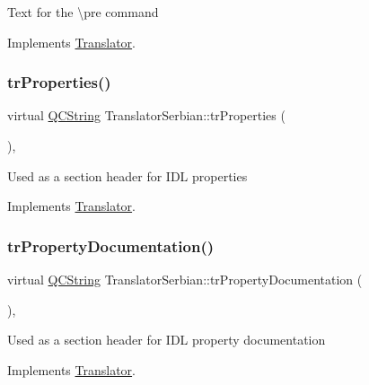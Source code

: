 Text for the \textbackslash{}pre command 

Implements \mbox{\hyperlink{class_translator}{Translator}}.

\mbox{\label{class_translator_serbian_aa25277f2f4e0caf962b810f2e9c65b0d}} 
\subsubsection{\texorpdfstring{trProperties()}{trProperties()}}
{\footnotesize\ttfamily virtual \mbox{\hyperlink{class_q_c_string}{Q\+C\+String}} Translator\+Serbian\+::tr\+Properties (\begin{DoxyParamCaption}{ }\end{DoxyParamCaption})\hspace{0.3cm}{\ttfamily [inline]}, {\ttfamily [virtual]}}

Used as a section header for I\+DL properties 

Implements \mbox{\hyperlink{class_translator}{Translator}}.

\mbox{\label{class_translator_serbian_ae1e53b1d4c7f31d633de6c02971144b8}} 
\subsubsection{\texorpdfstring{trPropertyDocumentation()}{trPropertyDocumentation()}}
{\footnotesize\ttfamily virtual \mbox{\hyperlink{class_q_c_string}{Q\+C\+String}} Translator\+Serbian\+::tr\+Property\+Documentation (\begin{DoxyParamCaption}{ }\end{DoxyParamCaption})\hspace{0.3cm}{\ttfamily [inline]}, {\ttfamily [virtual]}}

Used as a section header for I\+DL property documentation 

Implements \mbox{\hyperlink{class_translator}{Translator}}.

\mbox{\label{class_translator_serbian_ab87f76e14343a125150ff761380df112}} 
